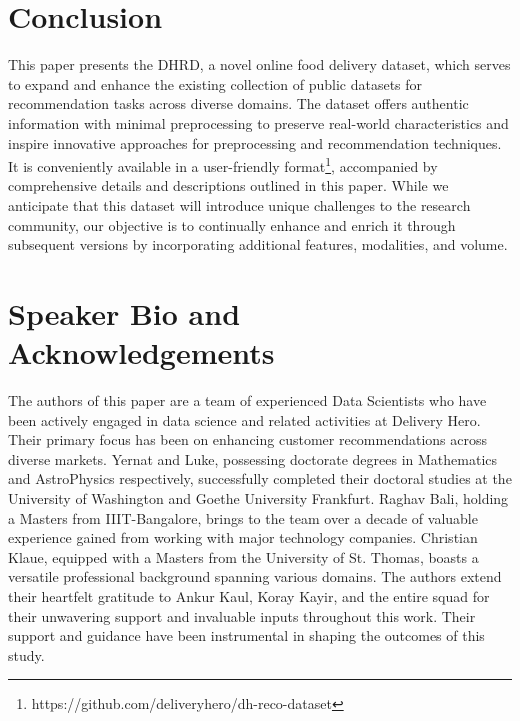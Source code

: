 \documentclass[manuscript]{acmart}
\newcommand{\dname}{DHRD}
\newcommand{\datalink}{https://github.com/deliveryhero/dh-reco-dataset}
\begin{document}
\section{Conclusion}
\label{sec:conclusion}
This paper presents the \dname, a novel online food delivery dataset,
which serves to expand and enhance the existing collection of public
datasets for recommendation tasks across diverse domains. The dataset
offers authentic information with minimal preprocessing to preserve
real-world characteristics and inspire innovative approaches for
preprocessing and recommendation techniques. It is conveniently available
in a user-friendly format\footnote{\datalink}, accompanied by
comprehensive details and descriptions outlined in this paper.  While we
anticipate that this dataset will introduce unique challenges to the
research community, our objective is to continually enhance and enrich it
through subsequent versions by incorporating additional features,
modalities, and volume.

\section{Speaker Bio and Acknowledgements}
\label{sec:speaker}
The authors of this paper are a team of experienced Data Scientists who
have been actively engaged in data science and related activities at
Delivery Hero. Their primary focus has been on enhancing customer
recommendations across diverse markets. Yernat and Luke, possessing
doctorate degrees in Mathematics and AstroPhysics respectively,
successfully completed their doctoral studies at the University of
Washington and Goethe University Frankfurt. Raghav Bali, holding a
Masters from IIIT-Bangalore, brings to the team over a decade of valuable
experience gained from working with major technology companies. Christian
Klaue, equipped with a Masters from the University of St. Thomas, boasts
a versatile professional background spanning various domains. The authors
extend their heartfelt gratitude to Ankur Kaul, Koray Kayir, and the
entire squad for their unwavering support and invaluable inputs
throughout this work. Their support and guidance have been instrumental
in shaping the outcomes of this study.

 
\end{document}

